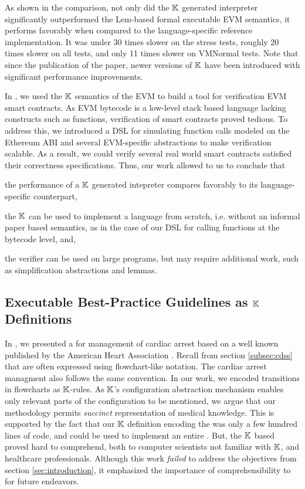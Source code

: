As shown in the comparison, not only did the $\mathbb{K}$ generated interpreter significantly
outperformed the Lem-based formal executable EVM semantics, it performs
favorably when compared to the language-specific reference implementation.
It was under 30 times slower on the stress tests, roughly 20 times
slower on all tests, and only 11 times slower on VMNormal tests.
Note that since the publication of the paper, newer versions
of $\mathbb{K}$ have been introduced with significant performance improvements.

In \cite{HildenbrandtCSF18,ParkFSE18}, we used the $\mathbb{K}$ semantics of the EVM to
build a tool for verification EVM smart contracts. As EVM bytecode is a
low-level stack based language lacking constructs such as functions,
verification of smart contracts proved tedious. To address this, we
introduced a DSL for simulating function calls modeled on the Ethereum ABI
\cite{ethereumAbiUrl} and several EVM-specific abstractions to make verification
scalable. As a result, we could verify several real world smart contracts
satisfied their correctness specifications. Thus, our work allowed to us
to conclude that
\begin{enumerate*}[label=(\roman*)]
  \item the performance of a $\mathbb{K}$ generated intepreter compares favorably to its
  language-specific counterpart,
  \item the $\mathbb{K}$ can be used to implement a language from scratch, i.e. without
  an informal paper based semantics, as in the case of our DSL for calling
  functions at the bytecode level, and,
  \item the verifier can be used on large programs, but may require additional
  work, such as simplification abstractions and lemmas.
\end{enumerate*}

\subsection{Executable Best-Practice Guidelines as $\mathbb{K}$ Definitions}

In \cite{Saxena22TR}, we presented a \CDSS{} for management of
cardiac arrest based on a well known \BPG{} published by the American Heart
Association \cite{AHAUrl}. Recall from section \ref{subsec:cdss} that
\BPGs{} are often expressed using flowchart-like notation. The cardiac arrest
managment \BPG{} also follows the same convention. In our work, we encoded
transitions in \BPG{} flowcharts as $\mathbb{K}$-rules. As $\mathbb{K}$'s
configuration abstraction mechanism enables only relevant parts of the
configuration to be mentioned, we argue that our methodology permits
\emph{succinct} representation of medical knowledge. This is supported by
the fact that our $\mathbb{K}$ definition encoding the \BPG was only a few hundred lines of
code, and could be used to implement an entire \CDSS{}. But, the $\mathbb{K}$ based
\BPG{} proved hard to comprehend, both to computer scientists not familiar with
$\mathbb{K}$, and healthcare professionals. Although this work \emph{failed} to address
the objectives from section \ref{sec:introduction}, it emphasized the importance
of comprehensibility to \HCPs{} for future endeavors.

\subsection{\MediK{}}

